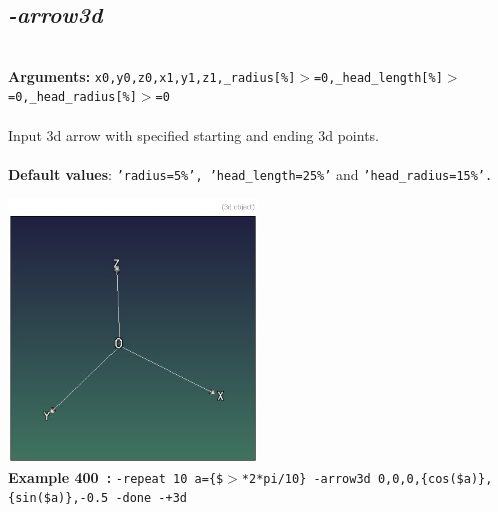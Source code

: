 \documentclass[a4paper,11pt,twoside]{book}
\begin{document}
\subsection{\emph{-arrow3d} }\vspace*{-0.5em}
~\\\textbf{Arguments: } 
{\small \texttt{x0,y0,z0,x1,y1,z1,\_radius[\%]$>$=0,\_head\_length[\%]$>$=0,\_head\_radius[\%]$>$=0}}\\~\\
Input 3d arrow with specified starting and ending 3d points.
~\\~\\\textbf{Default values}: {\small \texttt{'radius=5\%', 'head\_length=25\%'} and \texttt{'head\_radius=15\%'.}}
\begin{center}\includegraphics[keepaspectratio=true,height=7cm,width=\textwidth]{img/gmic_def400.jpg}\\
{\footnotesize \textbf{Example 400~:} \texttt{-repeat 10 a=\{\$$>$*2*pi/10\} -arrow3d 0,0,0,\{cos(\$a)\},\{sin(\$a)\},-0.5 -done -+3d}}
\end{center}
\end{document}
